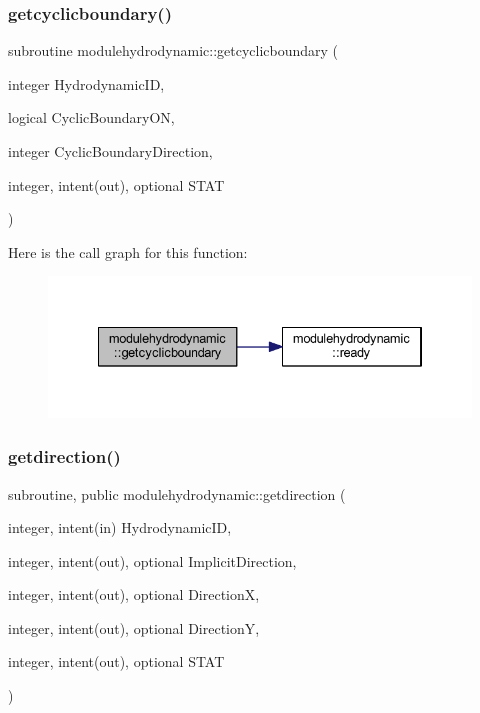\subsubsection{\texorpdfstring{getcyclicboundary()}{getcyclicboundary()}}
{\footnotesize\ttfamily subroutine modulehydrodynamic\+::getcyclicboundary (\begin{DoxyParamCaption}\item[{integer}]{Hydrodynamic\+ID,  }\item[{logical}]{Cyclic\+Boundary\+ON,  }\item[{integer}]{Cyclic\+Boundary\+Direction,  }\item[{integer, intent(out), optional}]{S\+T\+AT }\end{DoxyParamCaption})\hspace{0.3cm}{\ttfamily [private]}}

Here is the call graph for this function\+:\nopagebreak
\begin{figure}[H]
\begin{center}
\leavevmode
\includegraphics[width=334pt]{namespacemodulehydrodynamic_a073f4ba07360a6b7522733db2651b41d_cgraph}
\end{center}
\end{figure}
\mbox{\label{namespacemodulehydrodynamic_aaf6054c97ad6e684bd893e075b4d0641}} 
\subsubsection{\texorpdfstring{getdirection()}{getdirection()}}
{\footnotesize\ttfamily subroutine, public modulehydrodynamic\+::getdirection (\begin{DoxyParamCaption}\item[{integer, intent(in)}]{Hydrodynamic\+ID,  }\item[{integer, intent(out), optional}]{Implicit\+Direction,  }\item[{integer, intent(out), optional}]{DirectionX,  }\item[{integer, intent(out), optional}]{DirectionY,  }\item[{integer, intent(out), optional}]{S\+T\+AT }\end{DoxyParamCaption})}

